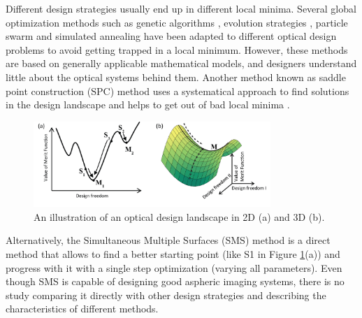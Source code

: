 Different design strategies usually end up in different local minima. Several global optimization methods such as genetic algorithms \cite{Moore1999}, evolution strategies \cite{Nagar:18}, particle swarm \cite{MenkeParticleSwarm} and simulated annealing \cite{Forbes1991} have been adapted to different optical design problems to avoid getting trapped in a local minimum. However, these methods are based on generally applicable mathematical models, and designers understand little about the optical systems behind them. Another method known as saddle point construction (SPC) method uses a systematical approach to find solutions in the design landscape and helps to get out of bad local minima \cite{BociortSPCSexplained}\cite{HouSimple16}.
 
\begin{figure}[h!]
    \centering
    \includegraphics[width=0.8\textwidth]{chapter-5/figures/Figure1_landscape.png}
    \caption{An illustration of an optical design landscape in 2D (a) and 3D (b). }
    \label{fig: fig1_landscape}
\end{figure}
Alternatively, the Simultaneous Multiple Surfaces (SMS) method is a direct method that allows to find a better starting point (like S1 in Figure \ref{fig: fig1_landscape}(a)) \cite{WangThesis}\cite{LinWang12OE} and progress with it with a single step optimization (varying all parameters). Even though SMS is capable of designing good aspheric imaging systems, there is no study comparing it directly with other design strategies and describing the characteristics of different methods.

